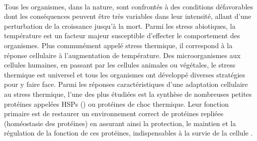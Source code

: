 

\paragraph*{} %
\label{par:intro1}

Tous les organismes, dans la nature, sont confrontés à des conditions défavorables dont les conséquences peuvent être très variables dans leur intensité, allant d'une perturbation de la croissance jusqu'à la mort.
Parmi les stress abiotiques, la température est un facteur majeur susceptible d'effecter le comportement des organismes.
Plus communément appelé stress thermique, il correspond à la réponse cellulaire à l'augmentation de température.
Des microorganismes aux cellules humaines, en passant par les cellules animales ou végétales, le stress thermique est universel et tous les organismes ont développé diverses stratégies pour y faire face.
Parmi les réponses caractéristiques d'une adaptation cellulaire au stress thermique, l'une des plus étudiées est la synthèse de nombreuses petites protéines appelées HSPs () ou protéines de choc thermique.
Leur fonction primaire est de restaurer un environnement correct de protéines repliées (homéostasie des protéines) en assurant ainsi la protection, le maintien et la régulation de la fonction de ces protéines, indispensables à la  survie de la cellule \cite{lindquist1988}.


